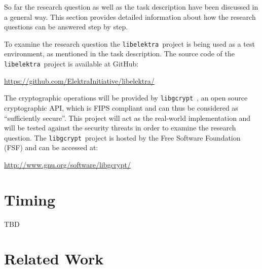 \documentclass[a4paper]{article}
\newcommand{\libelektra}{\texttt{libelektra}~}
\newcommand{\libgcrypt}{\texttt{libgcrypt}~}
\begin{document}
So far the research question as well as the task description have been discussed in a general way.
This section provides detailed information about how the research questions can be answered step by step.

To examine the research question the \libelektra project is being used as a test environment, as mentioned in the task description.
The source code of the \libelektra project is available at GitHub:

\url{https://github.com/ElektraInitiative/libelektra/}

The cryptographic operations will be provided by \libgcrypt, an open source cryptographic API, which is FIPS compliant and can thus be considered as ``sufficiently secure''.
This project will act as the real-world implementation and will be tested against the security threats in order to examine the research question.
The \libgcrypt project is hosted by the Free Software Foundation (FSF) and can be accessed at:

\url{http://www.gnu.org/software/libgcrypt/}



\section{Timing}
TBD
  

\section{Related Work}

\begingroup
\renewcommand{\section}[2]{}
\renewcommand{\refname}{}
\nocite{*}


\endgroup
\end{document}
